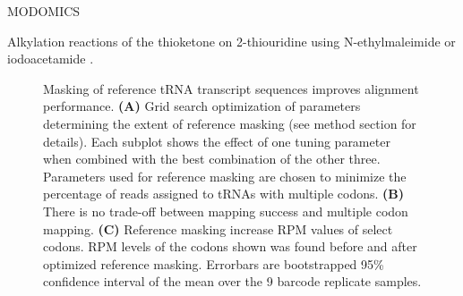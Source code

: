 \documentclass[9pt,lineno]{elife}
\begin{document}
MODOMICS \citep{Boccaletto2022-lr}

Alkylation reactions of the thioketone on 2-thiouridine using N-ethylmaleimide or iodoacetamide \citep{Edwards2020-jg}.



\begin{figure}[ht!]
\centering
{}
\caption{
Masking of reference tRNA transcript sequences improves alignment performance.
\textbf{(A)} Grid search optimization of parameters determining the extent of reference masking (see method section for details).
Each subplot shows the effect of one tuning parameter when combined with the best combination of the other three.
Parameters used for reference masking are chosen to minimize the percentage of reads assigned to tRNAs with multiple codons.
\textbf{(B)} There is no trade-off between mapping success and multiple codon mapping.
\textbf{(C)} Reference masking increase RPM values of select codons.
RPM levels of the codons shown was found before and after optimized reference masking.
Errorbars are bootstrapped 95\% confidence interval of the mean over the 9  barcode replicate samples.
}
\label{fig:Fig3}


\end{figure}
\end{document}

